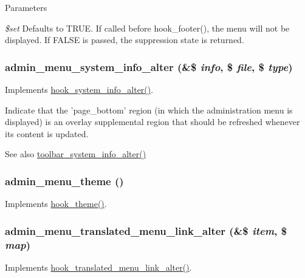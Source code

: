 \begin{DoxyParams}{Parameters}
\item[{\em \$set}]Defaults to TRUE. If called before hook\_\-footer(), the menu will not be displayed. If FALSE is passed, the suppression state is returned. \end{DoxyParams}
\hypertarget{admin__menu_8module_a3694a156592ca88ad768a279d4524384}{
\subsubsection[{admin\_\-menu\_\-system\_\-info\_\-alter}]{\setlength{\rightskip}{0pt plus 5cm}admin\_\-menu\_\-system\_\-info\_\-alter (\&\$ {\em info}, \/  \$ {\em file}, \/  \$ {\em type})}}
\label{admin__menu_8module_a3694a156592ca88ad768a279d4524384}
Implements \hyperlink{group__hooks_ga7dd7f887131916d5bbbb02ae87a9113e}{hook\_\-system\_\-info\_\-alter()}.

Indicate that the 'page\_\-bottom' region (in which the administration menu is displayed) is an overlay supplemental region that should be refreshed whenever its content is updated.

\begin{DoxySeeAlso}{See also}
\hyperlink{toolbar_8module_a6aea9fd1fb8df058eb4df4a7cb77d43e}{toolbar\_\-system\_\-info\_\-alter()} 
\end{DoxySeeAlso}
\hypertarget{admin__menu_8module_a7d7afd748df0dc6b8f912122cab9990c}{
\subsubsection[{admin\_\-menu\_\-theme}]{\setlength{\rightskip}{0pt plus 5cm}admin\_\-menu\_\-theme ()}}
\label{admin__menu_8module_a7d7afd748df0dc6b8f912122cab9990c}
Implements \hyperlink{group__hooks_ga013ccb45c7aaab1c16cf9691428c910d}{hook\_\-theme()}. \hypertarget{admin__menu_8module_a6fe2d9b57846191f435845489259ddde}{
\subsubsection[{admin\_\-menu\_\-translated\_\-menu\_\-link\_\-alter}]{\setlength{\rightskip}{0pt plus 5cm}admin\_\-menu\_\-translated\_\-menu\_\-link\_\-alter (\&\$ {\em item}, \/  \$ {\em map})}}
\label{admin__menu_8module_a6fe2d9b57846191f435845489259ddde}
Implements \hyperlink{group__hooks_ga5b5395b90c4987e29c6f6430fc066e8c}{hook\_\-translated\_\-menu\_\-link\_\-alter()}.

